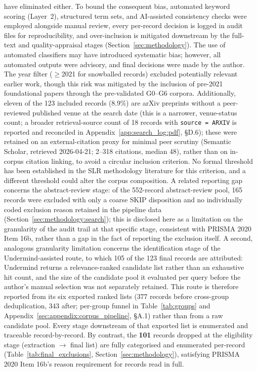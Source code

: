 have eliminated either. To bound the consequent bias, automated keyword scoring (Layer~2), structured term sets, and AI-assisted consistency checks were employed alongside manual review, every per-record decision is logged in audit files for reproducibility, and over-inclusion is mitigated downstream by the full-text and quality-appraisal stages (Section~\ref{sec:methodology}). The use of automated classifiers may have introduced systematic bias; however, all automated outputs were advisory, and final decisions were made by the author. The year filter ($\geq$2021 for snowballed records) excluded potentially relevant earlier work, though this risk was mitigated by the inclusion of pre-2021 foundational papers through the pre-validated G0--G6 corpora. Additionally, eleven of the 123 included records (8.9\%) are arXiv preprints without a peer-reviewed published venue at the search date (this is a narrower, venue-status count; a broader retrieval-source count of 18 records with \texttt{source = ARXIV} is reported and reconciled in Appendix~\ref{app:search_log:pdf}, \S D.6); these were retained on an external-citation proxy for minimal peer scrutiny (Semantic Scholar, retrieved 2026-04-21; 2--318 citations, median 48), rather than on in-corpus citation linking, to avoid a circular inclusion criterion. No formal threshold has been established in the SLR methodology literature for this criterion, and a different threshold could alter the corpus composition. A related reporting gap concerns the abstract-review stage: of the 552-record abstract-review pool, 165 records were excluded with only a coarse SKIP disposition and no individually coded exclusion reason retained in the pipeline data (Section~\ref{sec:methodology:search}); this is disclosed here as a limitation on the granularity of the audit trail at that specific stage, consistent with PRISMA 2020 Item 16b, rather than a gap in the fact of reporting the exclusion itself. A second, analogous granularity limitation concerns the identification stage of the Undermind-assisted route, to which 105 of the 123 final records are attributed: Undermind returns a relevance-ranked candidate list rather than an exhaustive hit count, and the size of the candidate pool it evaluated per query before the author's manual selection was not separately retained. This route is therefore reported from its six exported ranked lists (377 records before cross-group deduplication, 343 after; per-group funnel in Table~\ref{tab:groups} and Appendix~\ref{sec:appendix:corpus_pipeline}, \S A.1) rather than from a raw candidate pool. Every stage downstream of that exported list is enumerated and traceable record-by-record. By contrast,
 the \textbf{101} records dropped at the eligibility stage (extraction $\rightarrow$
 final list) are fully categorised and enumerated per-record
 (Table~\ref{tab:final_exclusions}, Section~\ref{sec:methodology}),
 satisfying PRISMA 2020 Item 16b's reason requirement for records read in
 full.

